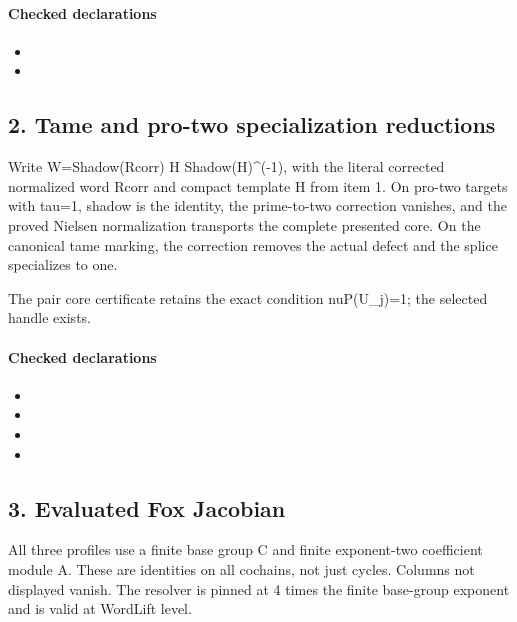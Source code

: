 \paragraph{Checked declarations}
\begin{itemize}
\item {}
\item {}
\end{itemize}

\subsection*{2. Tame and pro-two specialization reductions}
Write W=Shadow(Rcorr) H Shadow(H)\textasciicircum{}(-1), with the literal corrected normalized word Rcorr and compact template H from item 1. On pro-two targets with tau=1, shadow is the identity, the prime-to-two correction vanishes, and the proved Nielsen normalization transports the complete presented core. On the canonical tame marking, the correction removes the actual defect and the splice specializes to one.

The pair core certificate retains the exact condition nuP(U\_j)=1; the selected handle exists.

\paragraph{Checked declarations}
\begin{itemize}
\item {}
\item {}
\item {}
\item {}
\end{itemize}

\subsection*{3. Evaluated Fox Jacobian}
All three profiles use a finite base group C and finite exponent-two coefficient module A. These are identities on all cochains, not just cycles. Columns not displayed vanish. The resolver is pinned at 4 times the finite base-group exponent and is valid at WordLift level.

